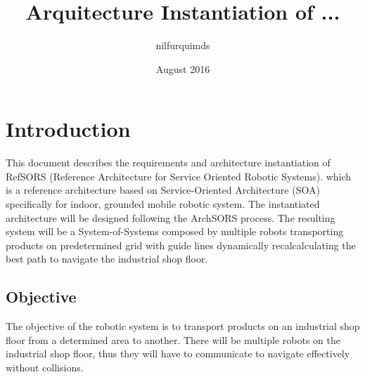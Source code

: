 \documentclass{article}
\title{Arquitecture Instantiation of ...}
\author{nilfurquimds}
\date{August 2016}
\begin{document}
\maketitle

\section*{Introduction}
This document describes the requirements and architecture instantiation of RefSORS (Reference Architecture for Service Oriented Robotic Systems). which is a reference architecture based on Service-Oriented Architecture (SOA) specifically for indoor, grounded mobile robotic system. The instantiated architecture will be designed following the ArchSORS process. The resulting system will be a System-of-Systems composed by multiple robots transporting products on predetermined grid with guide lines dynamically recalcalculating the best path to navigate the industrial shop floor.

\subsection*{Objective}
The objective of the robotic system is to transport products on an industrial shop floor from a determined area to another. There will be multiple robots on the industrial shop floor, thus they will have to communicate to navigate effectively without collisions.







\end{document}
